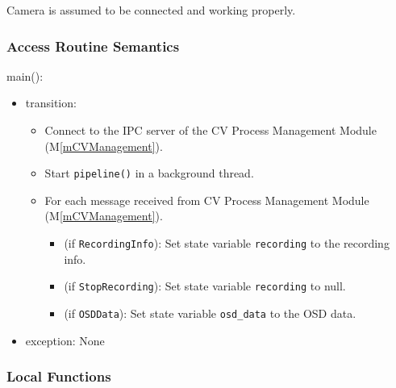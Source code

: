 \documentclass[12pt, titlepage]{article}
\newcommand{\mref}[1]{M\ref{#1}}
\begin{document}
Camera is assumed to be connected and working properly.

\subsubsection{Access Routine Semantics}

\noindent main():
\begin{itemize}
  \item transition:
        \begin{itemize}
          \item Connect to the IPC server of the CV Process Management Module
                (\mref{mCVManagement}).
          \item Start \texttt{pipeline()} in a background thread.
          \item For each message received from CV Process Management Module
                (\mref{mCVManagement}).
                \begin{itemize}
                  \item (if \texttt{RecordingInfo}): Set state variable \texttt{recording} to the recording info.
                  \item (if \texttt{StopRecording}): Set state variable \texttt{recording} to null.
                  \item (if \texttt{OSDData}): Set state variable \texttt{osd\_data} to the OSD data.
                \end{itemize}
        \end{itemize}
  \item exception: None
\end{itemize}

\subsubsection{Local Functions}
\end{document}
